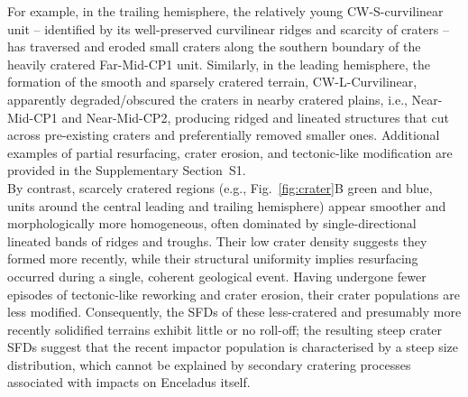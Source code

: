 \documentclass[preprint,11pt,3p,times,authoryear]{elsarticle}
\begin{document}
For example, in the trailing hemisphere, the relatively young CW-S-curvilinear unit -- identified by its well-preserved curvilinear ridges and scarcity of craters -- has traversed and eroded small craters along the southern boundary of the heavily cratered Far-Mid-CP1 unit. Similarly, in the leading hemisphere, the formation of the smooth and sparsely cratered terrain, CW-L-Curvilinear, apparently degraded/obscured the craters in nearby cratered plains, i.e., Near-Mid-CP1 and Near-Mid-CP2, producing ridged and lineated structures that cut across pre-existing craters and preferentially removed smaller ones. Additional examples of partial resurfacing, crater erosion, and tectonic-like modification are provided in the Supplementary Section~S1.\\

By contrast, scarcely cratered regions (e.g., Fig.~\ref{fig:crater}B green and blue, units around the central leading and trailing hemisphere) appear smoother and morphologically more homogeneous, often dominated by single-directional lineated bands of ridges and troughs. Their low crater density suggests they formed more recently, while their structural uniformity implies resurfacing occurred during a single, coherent geological event. Having undergone fewer episodes of tectonic-like reworking and crater erosion, their crater populations are less modified. 
Consequently, the SFDs of these less-cratered and presumably more recently solidified terrains exhibit little or no roll-off; the resulting steep crater SFDs suggest that the recent impactor population is characterised by a steep size distribution, which cannot be explained by secondary cratering processes associated with impacts on Enceladus itself.\normalcolor\\
\end{document}
